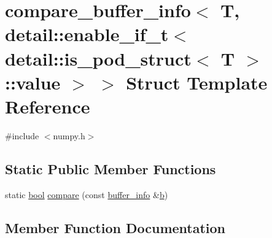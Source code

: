 \hypertarget{structcompare__buffer__info_3_01_t_00_01detail_1_1enable__if__t_3_01detail_1_1is__pod__struct_3_01_t_01_4_1_1value_01_4_01_4}{}\section{compare\+\_\+buffer\+\_\+info$<$ T, detail\+::enable\+\_\+if\+\_\+t$<$ detail\+::is\+\_\+pod\+\_\+struct$<$ T $>$\+::value $>$ $>$ Struct Template Reference}
\label{structcompare__buffer__info_3_01_t_00_01detail_1_1enable__if__t_3_01detail_1_1is__pod__struct_3_01_t_01_4_1_1value_01_4_01_4}


{\ttfamily \#include $<$numpy.\+h$>$}

\subsection*{Static Public Member Functions}
\begin{DoxyCompactItemize}
\item 
static \mbox{\hyperlink{asdl_8h_af6a258d8f3ee5206d682d799316314b1}{bool}} \mbox{\hyperlink{structcompare__buffer__info_3_01_t_00_01detail_1_1enable__if__t_3_01detail_1_1is__pod__struct_3_01_t_01_4_1_1value_01_4_01_4_ab0e66eb6cf042e81ddbb11d5f16d2ecb}{compare}} (const \mbox{\hyperlink{structbuffer__info}{buffer\+\_\+info}} \&\mbox{\hyperlink{_s_d_l__opengl__glext_8h_a0f71581a41fd2264c8944126dabbd010}{b}})
\end{DoxyCompactItemize}


\subsection{Member Function Documentation}
\mbox{\label{structcompare__buffer__info_3_01_t_00_01detail_1_1enable__if__t_3_01detail_1_1is__pod__struct_3_01_t_01_4_1_1value_01_4_01_4_ab0e66eb6cf042e81ddbb11d5f16d2ecb}} 
